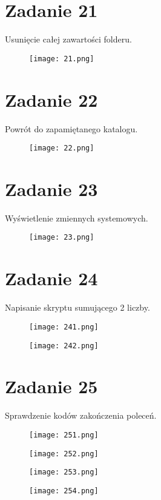\documentclass[fleqn,onecolumn,a4paper,12pt,titlepage]{article}
\begin{document}
\section*{Zadanie 21}
Usunięcie całej zawartości folderu.
\begin{figure}[H]%
    \centering\texttt{[image: 21.png]}
\end{figure}

\section*{Zadanie 22}
Powrót do zapamiętanego katalogu.
\begin{figure}[H]%
    \centering\texttt{[image: 22.png]}
\end{figure}

\section*{Zadanie 23}
Wyświetlenie zmiennych systemowych.
\begin{figure}[H]%
    \centering\texttt{[image: 23.png]}
\end{figure}

\section*{Zadanie 24}
Napisanie skryptu sumującego 2 liczby.
\begin{figure}[H]%
    \centering\texttt{[image: 241.png]}
\end{figure}
\begin{figure}[H]%
    \centering\texttt{[image: 242.png]}
\end{figure}

\section*{Zadanie 25}
Sprawdzenie kodów zakończenia poleceń.
\begin{figure}[H]%
    \centering\texttt{[image: 251.png]}
\end{figure}
\begin{figure}[H]%
    \centering\texttt{[image: 252.png]}
\end{figure}
\begin{figure}[H]%
    \centering\texttt{[image: 253.png]}
\end{figure}
\begin{figure}[H]%
    \centering\texttt{[image: 254.png]}
\end{figure}
\end{document}
